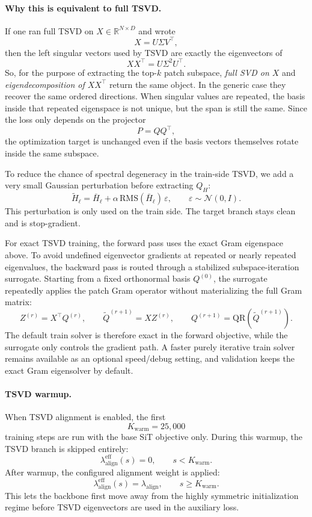 \documentclass[11pt]{article}
\begin{document}
\paragraph{Why this is equivalent to full TSVD.}
If one ran full TSVD on $X \in \mathbb{R}^{N \times D}$ and wrote
\[
X = U \Sigma V^\top,
\]
then the left singular vectors used by TSVD are exactly the eigenvectors of
\[
X X^\top = U \Sigma^2 U^\top.
\]
So, for the purpose of extracting the top-$k$ patch subspace, \emph{full SVD on $X$} and \emph{eigendecomposition of $X X^\top$} return the same object. In the generic case they recover the same ordered directions. When singular values are repeated, the basis inside that repeated eigenspace is not unique, but the span is still the same. Since the loss only depends on the projector
\[
P = Q Q^\top,
\]
the optimization target is unchanged even if the basis vectors themselves rotate inside the same subspace.

To reduce the chance of spectral degeneracy in the train-side TSVD, we add a very small Gaussian perturbation before extracting $Q_H$:
\[
\tilde{H}_\ell = \bar{H}_\ell + \alpha \,\mathrm{RMS}(\bar{H}_\ell)\,\varepsilon,
\qquad
\varepsilon \sim \mathcal{N}(0,I).
\]
This perturbation is only used on the train side. The target branch stays clean and is stop-gradient.

For exact TSVD training, the forward pass uses the exact Gram eigenspace above. To avoid undefined eigenvector gradients at repeated or nearly repeated eigenvalues, the backward pass is routed through a stabilized subspace-iteration surrogate. Starting from a fixed orthonormal basis $Q^{(0)}$, the surrogate repeatedly applies the patch Gram operator without materializing the full Gram matrix:
\[
Z^{(r)} = X^\top Q^{(r)}, \qquad
\tilde{Q}^{(r+1)} = X Z^{(r)}, \qquad
Q^{(r+1)} = \mathrm{QR}(\tilde{Q}^{(r+1)}).
\]
The default train solver is therefore exact in the forward objective, while the surrogate only controls the gradient path. A faster purely iterative train solver remains available as an optional speed/debug setting, and validation keeps the exact Gram eigensolver by default.

\paragraph{TSVD warmup.}
When TSVD alignment is enabled, the first
\[
K_{\mathrm{warm}} = 25{,}000
\]
training steps are run with the base SiT objective only. During this warmup, the TSVD branch is skipped entirely:
\[
\lambda_{\mathrm{align}}^{\mathrm{eff}}(s) = 0,
\qquad s < K_{\mathrm{warm}}.
\]
After warmup, the configured alignment weight is applied:
\[
\lambda_{\mathrm{align}}^{\mathrm{eff}}(s) = \lambda_{\mathrm{align}},
\qquad s \ge K_{\mathrm{warm}}.
\]
This lets the backbone first move away from the highly symmetric initialization regime before TSVD eigenvectors are used in the auxiliary loss.
\end{document}
